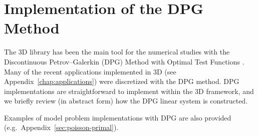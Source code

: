 %
%

\chapter{Implementation of the DPG Method}
\label{chap:dpg}


The \hp3D library has been the main tool for the numerical studies with the Discontinuous Petrov--Galerkin (DPG) Method with Optimal Test Functions \cite{demkowicz2017dpg}. Many of the recent applications implemented in \hp3D (see Appendix~\ref{chap:applications}) were discretized with the DPG method. DPG implementations are straightforward to implement within the \hp3D framework, and we briefly review (in abstract form) how the DPG linear system is constructed. 

Examples of model problem implementations with DPG are also provided (e.g.~Appendix~\ref{sec:poisson-primal}).

